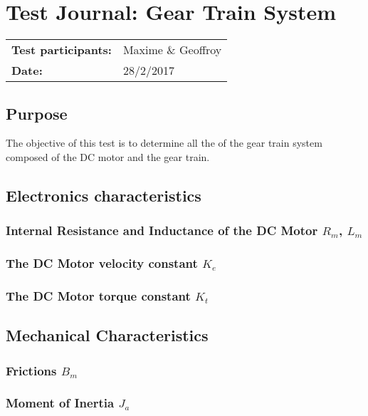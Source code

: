 \graphicspath{{figures/appendix/}}
\chapter{Test Journal: Gear Train System}\label{appendix:DCMotorInductance}
\begin{table}[htbp]
\begin{tabular}{l l}
\textbf{Test participants:} & Maxime \& Geoffroy  \\
\textbf{Date:}  & 28/2/2017
\end{tabular}
\end{table}

\section*{Purpose}
The objective of this test is to determine all the of the gear train system composed of the DC motor and the gear train.
\section*{Electronics characteristics}

\subsection*{Internal Resistance and Inductance of the DC Motor $R_m$, $L_m$}


\subsection{The DC Motor velocity constant $K_e$}



\subsection{The DC Motor torque constant $K_t$}


\section{Mechanical Characteristics}

\subsection{Frictions $B_m$}


\subsection{Moment of Inertia $J_a$}
